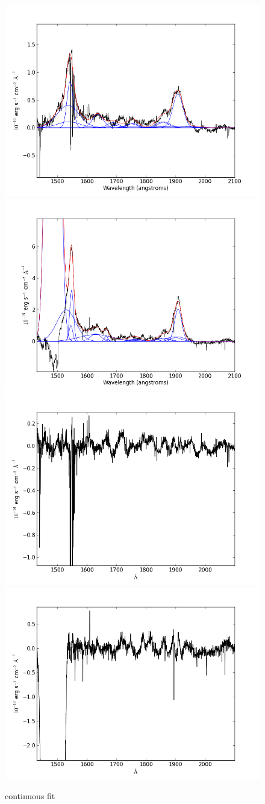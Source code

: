 \documentclass[usenatbib]{mn2e}
\begin{document}
\newpage

\begin{figure}
\begin{center}
\includegraphics[width=0.46\linewidth,angle=0]{C_8.png}
\vspace{5mm}
\includegraphics[width=0.49\linewidth,angle=0]{C_9.png}\\
\includegraphics[width=0.46\linewidth,angle=0]{C_res_8.png}
\hspace{5mm}
\includegraphics[width=0.49\linewidth,angle=0]{C_res_9.png}\\
\end{center} 
\caption{continuous fit \label{fig:landscape}}   
\end{figure}
\end{document}
